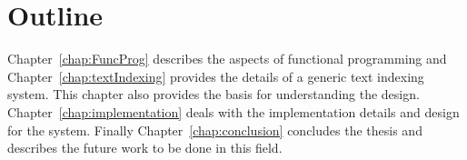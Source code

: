 \section{Outline}
Chapter~\ref{chap:FuncProg} describes the aspects of functional programming and
Chapter~\ref{chap:textIndexing} provides the details of a generic text indexing system.
This chapter also provides the basis for understanding the design.
Chapter~\ref{chap:implementation} deals with the implementation details and design for the system.
Finally Chapter~\ref{chap:conclusion} concludes the thesis and describes the future work to be done in this field.

